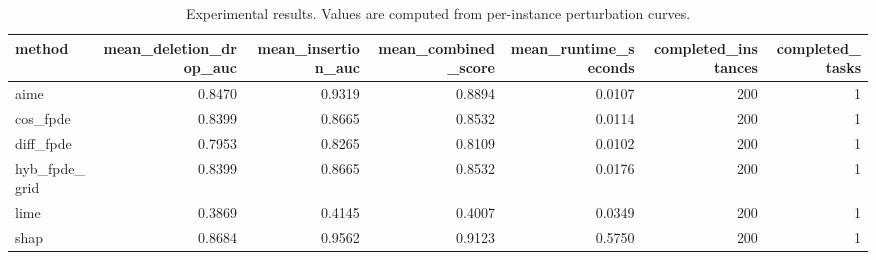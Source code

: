 \begin{table}[t]
\caption{Experimental results. Values are computed from per-instance perturbation curves.}
\label{tab:main_results_computed}
\centering
\begin{tabular}{lrrrrrr}
\toprule
method & mean\_deletion\_drop\_auc & mean\_insertion\_auc & mean\_combined\_score & mean\_runtime\_seconds & completed\_instances & completed\_tasks \\
\midrule
aime & 0.8470 & 0.9319 & 0.8894 & 0.0107 & 200 & 1 \\
cos\_fpde & 0.8399 & 0.8665 & 0.8532 & 0.0114 & 200 & 1 \\
diff\_fpde & 0.7953 & 0.8265 & 0.8109 & 0.0102 & 200 & 1 \\
hyb\_fpde\_grid & 0.8399 & 0.8665 & 0.8532 & 0.0176 & 200 & 1 \\
lime & 0.3869 & 0.4145 & 0.4007 & 0.0349 & 200 & 1 \\
shap & 0.8684 & 0.9562 & 0.9123 & 0.5750 & 200 & 1 \\
\bottomrule
\end{tabular}

\end{table}
